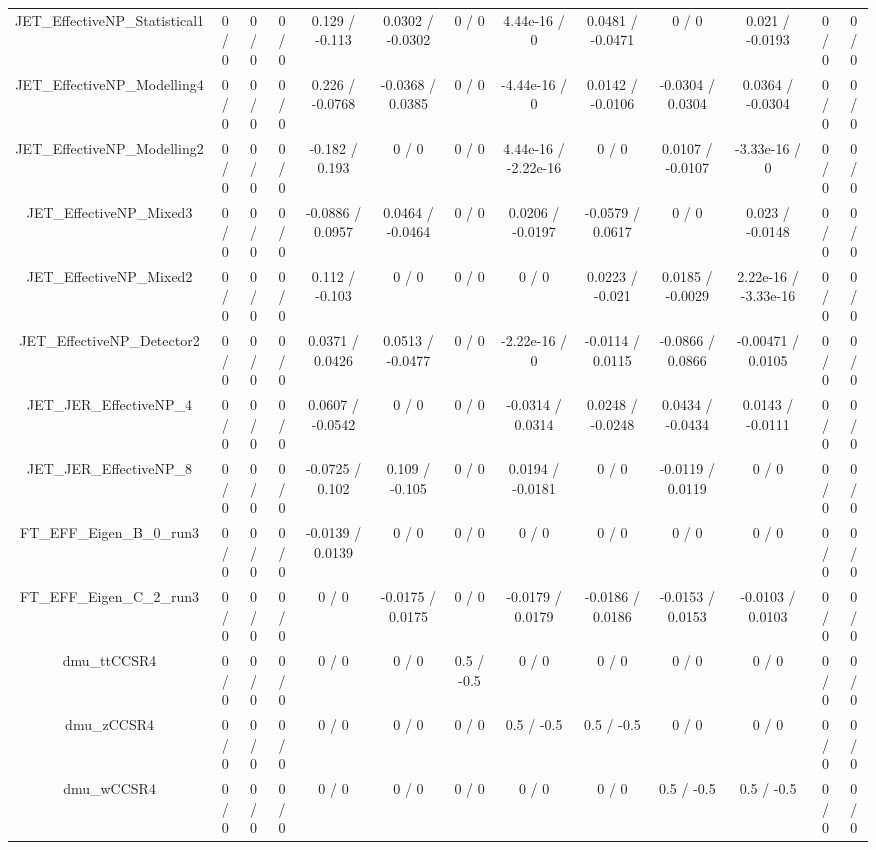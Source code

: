 \documentclass[10pt]{article}
\begin{document}
\begin{table}[htbp]
\begin{center}
\begin{tabular}{|c|c|c|c|c|c|c|c|c|c|c|c|c|}
  JET_EffectiveNP_Statistical1 & 0 / 0 & 0 / 0 & 0 / 0 & 0.129 / -0.113 & 0.0302 / -0.0302 & 0 / 0 & 4.44e-16 / 0 & 0.0481 / -0.0471 & 0 / 0 & 0.021 / -0.0193 & 0 / 0 & 0 / 0 \\ 
  JET_EffectiveNP_Modelling4 & 0 / 0 & 0 / 0 & 0 / 0 & 0.226 / -0.0768 & -0.0368 / 0.0385 & 0 / 0 & -4.44e-16 / 0 & 0.0142 / -0.0106 & -0.0304 / 0.0304 & 0.0364 / -0.0304 & 0 / 0 & 0 / 0 \\ 
  JET_EffectiveNP_Modelling2 & 0 / 0 & 0 / 0 & 0 / 0 & -0.182 / 0.193 & 0 / 0 & 0 / 0 & 4.44e-16 / -2.22e-16 & 0 / 0 & 0.0107 / -0.0107 & -3.33e-16 / 0 & 0 / 0 & 0 / 0 \\ 
  JET_EffectiveNP_Mixed3 & 0 / 0 & 0 / 0 & 0 / 0 & -0.0886 / 0.0957 & 0.0464 / -0.0464 & 0 / 0 & 0.0206 / -0.0197 & -0.0579 / 0.0617 & 0 / 0 & 0.023 / -0.0148 & 0 / 0 & 0 / 0 \\ 
  JET_EffectiveNP_Mixed2 & 0 / 0 & 0 / 0 & 0 / 0 & 0.112 / -0.103 & 0 / 0 & 0 / 0 & 0 / 0 & 0.0223 / -0.021 & 0.0185 / -0.0029 & 2.22e-16 / -3.33e-16 & 0 / 0 & 0 / 0 \\ 
  JET_EffectiveNP_Detector2 & 0 / 0 & 0 / 0 & 0 / 0 & 0.0371 / 0.0426 & 0.0513 / -0.0477 & 0 / 0 & -2.22e-16 / 0 & -0.0114 / 0.0115 & -0.0866 / 0.0866 & -0.00471 / 0.0105 & 0 / 0 & 0 / 0 \\ 
  JET_JER_EffectiveNP_4 & 0 / 0 & 0 / 0 & 0 / 0 & 0.0607 / -0.0542 & 0 / 0 & 0 / 0 & -0.0314 / 0.0314 & 0.0248 / -0.0248 & 0.0434 / -0.0434 & 0.0143 / -0.0111 & 0 / 0 & 0 / 0 \\ 
  JET_JER_EffectiveNP_8 & 0 / 0 & 0 / 0 & 0 / 0 & -0.0725 / 0.102 & 0.109 / -0.105 & 0 / 0 & 0.0194 / -0.0181 & 0 / 0 & -0.0119 / 0.0119 & 0 / 0 & 0 / 0 & 0 / 0 \\ 
  FT_EFF_Eigen_B_0_run3 & 0 / 0 & 0 / 0 & 0 / 0 & -0.0139 / 0.0139 & 0 / 0 & 0 / 0 & 0 / 0 & 0 / 0 & 0 / 0 & 0 / 0 & 0 / 0 & 0 / 0 \\ 
  FT_EFF_Eigen_C_2_run3 & 0 / 0 & 0 / 0 & 0 / 0 & 0 / 0 & -0.0175 / 0.0175 & 0 / 0 & -0.0179 / 0.0179 & -0.0186 / 0.0186 & -0.0153 / 0.0153 & -0.0103 / 0.0103 & 0 / 0 & 0 / 0 \\ 
  dmu_ttCCSR4 & 0 / 0 & 0 / 0 & 0 / 0 & 0 / 0 & 0 / 0 & 0.5 / -0.5 & 0 / 0 & 0 / 0 & 0 / 0 & 0 / 0 & 0 / 0 & 0 / 0 \\ 
  dmu_zCCSR4 & 0 / 0 & 0 / 0 & 0 / 0 & 0 / 0 & 0 / 0 & 0 / 0 & 0.5 / -0.5 & 0.5 / -0.5 & 0 / 0 & 0 / 0 & 0 / 0 & 0 / 0 \\ 
  dmu_wCCSR4 & 0 / 0 & 0 / 0 & 0 / 0 & 0 / 0 & 0 / 0 & 0 / 0 & 0 / 0 & 0 / 0 & 0.5 / -0.5 & 0.5 / -0.5 & 0 / 0 & 0 / 0 \\ 

\end{tabular}
\end{center}
\end{table}
\end{document}
